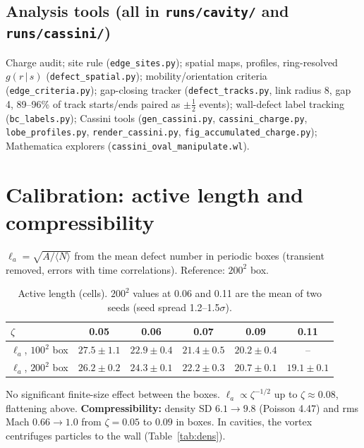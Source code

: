 \documentclass[11pt,a4paper]{article}
\newcommand{\la}{\ell_a}
\begin{document}
\subsection{Analysis tools (all in \texttt{runs/cavity/} and \texttt{runs/cassini/})}
{\sloppy
Charge audit; site rule (\texttt{edge\_sites.py}); spatial maps, profiles, ring-resolved $g(r\,|\,s)$
(\texttt{defect\_spatial.py}); mobility/orientation criteria (\texttt{edge\_criteria.py}); gap-closing tracker
(\texttt{defect\_tracks.py}, link radius 8, gap 4, 89--96\% of track starts/ends paired as $\pm\frac12$ events);
wall-defect label tracking (\texttt{bc\_labels.py}); Cassini tools (\texttt{gen\_cassini.py}, \texttt{cassini\_charge.py},
\texttt{lobe\_profiles.py}, \texttt{render\_cassini.py}, \texttt{fig\_accumulated\_charge.py}); Mathematica explorers
(\texttt{cassini\_oval\_manipulate.wl}).\par}

\section{Calibration: active length and compressibility}
$\la=\sqrt{A/\langle N\rangle}$ from the mean defect number in periodic boxes (transient removed, errors with time
correlations). Reference: $200^2$ box.
\begin{table}[h]\centering\small
\caption{Active length (cells). $200^2$ values at 0.06 and 0.11 are the mean of two seeds (seed spread 1.2--1.5$\sigma$).}
\begin{tabular}{lccccc}\toprule
$\zeta$ & 0.05 & 0.06 & 0.07 & 0.09 & 0.11\\\midrule
$\la$, $100^2$ box & $27.5\pm1.1$ & $22.9\pm0.4$ & $21.4\pm0.5$ & $20.2\pm0.4$ & --\\
$\la$, $200^2$ box & $26.2\pm0.2$ & $24.3\pm0.1$ & $\mathbf{22.2\pm0.3}$ & $20.7\pm0.1$ & $19.1\pm0.1$\\\bottomrule
\end{tabular}
\end{table}
No significant finite-size effect between the boxes. $\la\propto\zeta^{-1/2}$ up to $\zeta\approx0.08$, flattening above.
\textbf{Compressibility:} density SD $6.1\to9.8$ (Poisson 4.47) and rms Mach $0.66\to1.0$ from $\zeta=0.05$ to $0.09$
in boxes. In cavities, the vortex centrifuges particles to the wall (Table~\ref{tab:dens}).
\end{document}
